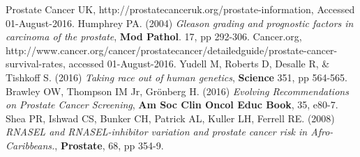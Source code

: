 \documentclass[final]{article}
\begin{document}
\begin{thebibliography}{1}
    Prostate Cancer UK,
    http://prostatecanceruk.org/prostate-information,
    Accessed 01-August-2016.
    Humphrey PA.
    (2004)
    \emph{Gleason grading and prognostic factors in carcinoma of the prostate},
    \textbf{Mod Pathol}.
    17,
    pp 292-306.
    Cancer.org,
    http://www.cancer.org/cancer/prostatecancer/detailedguide/prostate-cancer-survival-rates,
    accessed 01-August-2016.
    Yudell M, Roberts D, Desalle R, \& Tishkoff S.
    (2016)
    \emph{Taking race out of human genetics},
    \textbf{Science}
    351,
    pp 564-565.
    Brawley OW, Thompson IM Jr, Grönberg H.
    (2016)
    \emph{Evolving Recommendations on Prostate Cancer Screening},
    \textbf{Am Soc Clin Oncol Educ Book},
    35,
    e80-7.
    Shea PR, Ishwad CS, Bunker CH, Patrick AL, Kuller LH, Ferrell RE.
    (2008)
    \emph{RNASEL and RNASEL-inhibitor variation and prostate cancer risk in Afro-Caribbeans.},
    \textbf{Prostate},
    68,
    pp 354-9.

\end{thebibliography}
\end{document}

